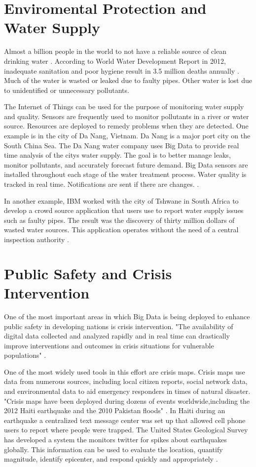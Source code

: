 \documentclass[sigconf]{acmart}
\begin{document}
\section{Enviromental Protection and Water Supply}

Almost a billion people in the world to not have a reliable source of clean drinking water \cite{www-google-top10}. According to World Water Development Report in 2012, inadequate sanitation and poor hygiene result in 3.5 million deaths annually \cite{www-google-top10}. Much of the water is wasted or leaked due to faulty pipes. Other water is lost due to unidentified or unnecessary pollutants.

The Internet of Things can be used for the purpose of monitoring water supply and quality. Sensors are frequently used to monitor pollutants in a river or water source. Resources are deployed to remedy problems when they are detected.  One example is in the city of Da Nang, Vietnam. Da Nang is a major port city on the South China Sea. The Da Nang water company uses Big Data to provide real time analysis of the citys water supply. The goal is to better manage leaks, monitor pollutants, and accurately forecast future demand. Big Data sensors are installed throughout each stage of the water treatment process. Water quality is tracked in real time. Notifications are sent if there are changes. \cite{DevEcon}.

In another example, IBM worked with the city of Tshwane in South Africa to develop a crowd source application that users use to report water supply issues such as faulty pipes. The result was the discovery of thirty million dollars of wasted water sources. This application operates without the need of a central inspection authority \cite{www-google-Hffpst}.

\section{Public Safety and Crisis Intervention}

One of the most important areas in which Big Data is being deployed to enhance public safety in developing nations is crisis intervention. "The availability of digital data collected and analyzed rapidly and in real time can drastically improve interventions and outcomes in crisis situations for vulnerable populations" \cite{www-google-GloPls}.  

One of the most widely used tools in this effort are crisis maps. Crisis maps use data from numerous sources, including local citizen reports, social network data, and environmental data to aid emergency responders in times of natural disaster. "Crisis maps have been deployed during dozens of events worldwide,including the 2012 Haiti earthquake and the 2010 Pakistan floods" \cite{www-google-Hffpst}.
In Haiti during an earthquake a centralized text message center was set up that allowed cell phone users to report where people were trapped. The United States Geological Survey has developed a system the monitors twitter for spikes about earthquakes globally. This information can be used to evaluate the location, quantify magnitude, identify epicenter, and respond quickly and appropriately \cite{www-google-GloPls}.
\end{document}
